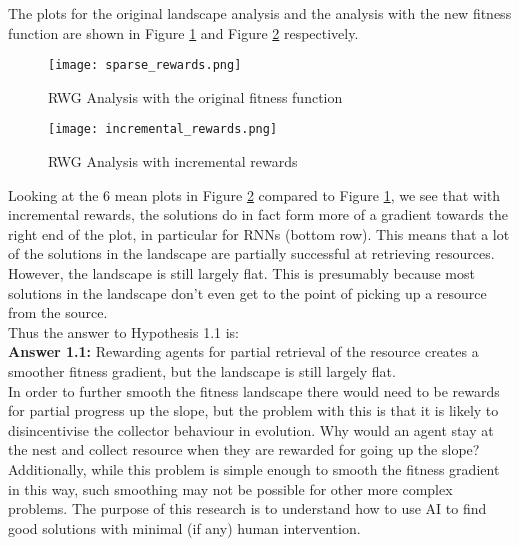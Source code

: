 \documentclass[12pt]{article}
\begin{document}
The plots for the original landscape analysis and the analysis with the new fitness function are shown in Figure \ref{fig:sparse} and Figure \ref{fig:incremental} respectively.\\

\begin{figure}[h]
\centering
\texttt{[image: sparse\_rewards.png]}
\caption{RWG Analysis with the original fitness function}
\label{fig:sparse}
\end{figure}

\begin{figure}[h]
\centering
\texttt{[image: incremental\_rewards.png]}
\caption{RWG Analysis with incremental rewards}
\label{fig:incremental}
\end{figure}

Looking at the 6 mean plots in Figure \ref{fig:incremental} compared to Figure \ref{fig:sparse}, we see that with incremental rewards, the solutions do in fact form more of a gradient towards the right end of the plot, in particular for RNNs (bottom row). 
This means that a lot of the solutions in the landscape are partially successful at retrieving resources. 
However, the landscape is still largely flat. 
This is presumably because most solutions in the landscape don't even get to the point of picking up a resource from the source.\\ 

Thus the answer to Hypothesis 1.1 is:\\

\textbf{Answer 1.1:} Rewarding agents for partial retrieval of the resource creates a smoother fitness gradient, but the landscape is still largely flat.\\

In order to further smooth the fitness landscape there would need to be rewards for partial progress up the slope, but the problem with this is that it is likely to disincentivise the collector behaviour in evolution.
Why would an agent stay at the nest and collect resource when they are rewarded for going up the slope? 
Additionally, while this problem is simple enough to smooth the fitness gradient in this way, such smoothing may not be possible for other more complex problems.
The purpose of this research is to understand how to use AI to find good solutions with minimal (if any) human intervention.\\
\end{document}
